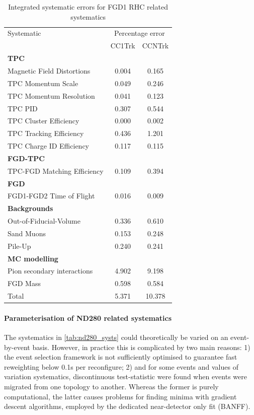 \begin{table}[h]
	\begin{tabular}{l | c c}
		\hline
		\hline
		Systematic & \multicolumn{2}{c}{Percentage error} \\
				   & CC1Trk & CCNTrk \\ 
		\hline	
		\multicolumn{3}{l}{\textbf{TPC}} \\
		Magnetic Field Distortions		& 0.004 & 0.165 \\
		TPC Momentum Scale				& 0.049 & 0.246 \\
		TPC Momentum Resolution			& 0.041 & 0.123 \\
		TPC PID							& 0.307 & 0.544 \\
		TPC Cluster Efficiency			& 0.000 & 0.002 \\
		TPC Tracking Efficiency			& 0.436 & 1.201 \\
		TPC Charge ID Efficiency		& 0.117 & 0.115 \\
		\hline 
		\multicolumn{3}{l}{\textbf{FGD-TPC}} \\
		TPC-FGD Matching Efficiency		& 0.109 & 0.394 \\
		\hline
		\multicolumn{3}{l}{\textbf{FGD}} \\
		FGD1-FGD2 Time of Flight		& 0.016 & 0.009 \\
		\hline
		\multicolumn{3}{l}{\textbf{Backgrounds}} \\
		Out-of-Fiducial-Volume			& 0.336 & 0.610 \\
		Sand Muons						& 0.153 & 0.248 \\
		Pile-Up							& 0.240 & 0.241 \\
		\hline
		\multicolumn{3}{l}{\textbf{MC modelling}} \\
		Pion secondary interactions		& 4.902 & 9.198 \\
		FGD Mass						& 0.598 & 0.584 \\
		\hline
		Total 							& 5.371 & 10.378 \\
		\hline
		\hline
	\end{tabular}
	\caption{Integrated systematic errors for FGD1 RHC related systematics}
	\label{tab:nd280_syst_error_nubar}
\end{table}

\paragraph{Parameterisation of ND280 related systematics}
The systematics in \autoref{tab:nd280_systs} could theoretically be varied on an event-by-event basis. However, in practice this is complicated by two main reasons: 1) the event selection framework is not sufficiently optimised to guarantee fast reweighting below 0.1s per reconfigure; 2) and for some events and values of variation systematics, discontinuous test-statistic were found when events were migrated from one topology to another. Whereas the former is purely computational, the latter causes problems for finding minima with gradient descent algorithms, employed by the dedicated near-detector only fit (BANFF). 

